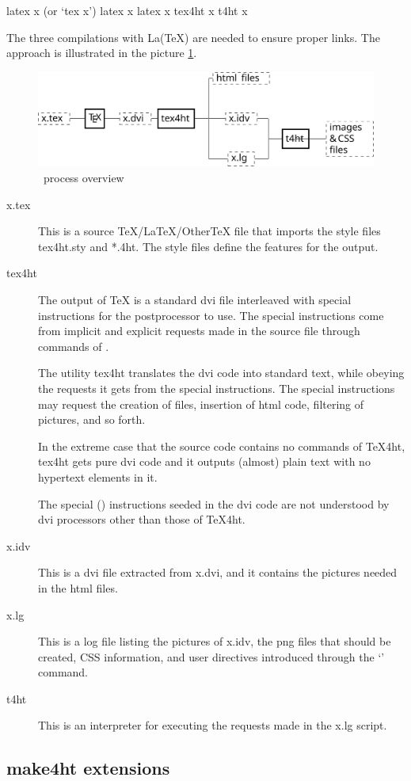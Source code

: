 \begin{shellcommand}
latex      x            (or ‘tex x’) 
latex      x 
latex      x 
tex4ht     x 
t4ht       x 
\end{shellcommand}

The three compilations with La(TeX) are needed to ensure proper links. The approach is illustrated in the picture \ref{fig:process}. 

\begin{figure}
  \includegraphics[width=\textwidth]{images/tex4ht_process/tex4ht_process}
  \caption{\texfourht\ process overview}
  \label{fig:process}
\end{figure}

\begin{description}
  \item[x.tex]

This is a source TeX/LaTeX/OtherTeX file that imports the style files tex4ht.sty and *.4ht. The style files define the features for the output.

\item[tex4ht]

The output of \TeX{} is a standard dvi file interleaved with special
instructions for the postprocessor  to use. The special
instructions come from implicit and explicit requests made in the source file
through commands of \texfourht.

The utility tex4ht translates the dvi code into standard text, while obeying
the requests it gets from the special instructions. The special instructions
may request the creation of files, insertion of html code, filtering of
pictures, and so forth.

In the extreme case that the source code contains no commands of TeX4ht, tex4ht
gets pure dvi code and it outputs (almost) plain text with no hypertext
elements in it.

The special (\texcommand{\special}) instructions seeded in the dvi code are not understood
by dvi processors other than those of TeX4ht.

\item[x.idv]

This is a dvi file extracted from x.dvi, and it contains the pictures needed in
the html files.

\item[x.lg]

This is a log file listing the pictures of x.idv, the png files that should be
created, CSS information, and user directives introduced through the
‘’ command.

\item[t4ht]
This is an interpreter for executing the requests made in the x.lg script.

\end{description}

\subsection{make4ht extensions}\label{sec:make4ht-extensions}

